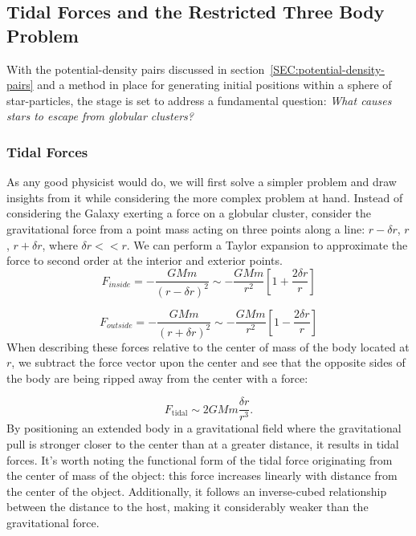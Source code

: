 \subsection{Tidal Forces and the Restricted Three Body Problem}

With the potential-density pairs discussed in section~\ref{SEC:potential-density-pairs} and a method in place for generating initial positions within a sphere of star-particles, the stage is set to address a fundamental question: \textit{What causes stars to escape from globular clusters?}

\subsubsection*{Tidal Forces}
As any good physicist would do, we will first solve a simpler problem and draw insights from it while considering the more complex problem at hand. Instead of considering the Galaxy exerting a force on a globular cluster, consider the gravitational force from a point mass acting on three points along a line: $r-\delta r$, $r$, $r+\delta r$, where $\delta r<< r$. We can perform a Taylor expansion to approximate the force to second order at the interior and exterior points.   
\begin{equation}
    F_{inside}=-\frac{GMm}{\left(r-\delta r\right)^2} \sim -\frac{GMm}{r^2}\left[1+\frac{2\delta r}{r}\right]
\end{equation}

\begin{equation}
    F_{outside}=-\frac{GMm}{\left(r+\delta r\right)^2} \sim -\frac{GMm}{r^2}\left[1-\frac{2\delta r}{r}\right]
\end{equation}
When describing these forces relative to the center of mass of the body located at $r$, we subtract the force vector upon the center and see that the opposite sides of the body are being ripped away from the center with a force:

\begin{equation}
    F_{\mathrm{tidal}}\sim 2GMm \frac{\delta r}{r^3}.
\end{equation} 
By positioning an extended body in a gravitational field where the gravitational pull is stronger closer to the center than at a greater distance, it results in tidal forces. It's worth noting the functional form of the tidal force originating from the center of mass of the object: this force increases linearly with distance from the center of the object. Additionally, it follows an inverse-cubed relationship between the distance to the host, making it considerably weaker than the gravitational force. 

